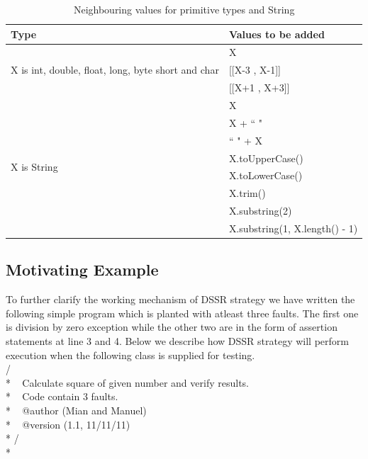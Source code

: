 \begin{table}[ht]
\scriptsize
\caption{Neighbouring values for primitive types and String} %
\centering %
\begin{tabular}{| l | l |} %
\hline\hline %
Type & Values to be added\\ [0.5ex] %
\hline %
\multirow{3}{*}{X is int, double, float, long, byte short and char} & X \\ %

&[[X-3 , X-1]] \\
&[[X+1 , X+3]]\\
\hline
\multirow{8}{*}{X is String} & X\\ %

& X + ``  "\\ %
& ``  " + X \\ %
& X.toUpperCase() \\
& X.toLowerCase() \\
& X.trim() \\
& X.substring(2) \\
& X.substring(1, X.length() - 1) \\[1ex]
\hline
\hline %
\end{tabular}
\label{table:addvalues} %
\end{table}


\subsection{Motivating Example}
To further clarify the working mechanism of DSSR strategy we have written the following simple program which is planted with atleast three faults. The first one is division by zero exception while the other two are in the form of assertion statements at line 3 and 4.  Below we describe how DSSR strategy will perform execution when the following class is supplied for testing.\\

\noindent
/ \textasteriskcentered \textasteriskcentered \\*
\textasteriskcentered   ~ Calculate square of given number and verify results. \\*
\textasteriskcentered   ~ Code contain 3 faults.\\*
\textasteriskcentered   ~ @author (Mian and Manuel) \\* 
\textasteriskcentered   ~ @version (1.1, 11/11/11)\\*
\textasteriskcentered / \\*

